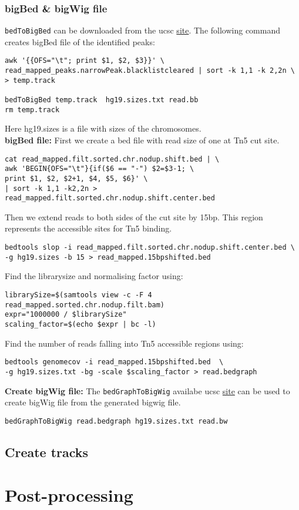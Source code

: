 \documentclass[10pt]{article}
\newcommand{\prog}[1]{\texttt{#1}}
\begin{document}
\subsubsection{bigBed \& bigWig file} \prog{bedToBigBed} can be downloaded from the ucsc \href{http://hgdownload.cse.ucsc.edu/admin/exe/}{site}. The following command creates bigBed file of the identified peaks:
\begin{verbatim}
awk '{{OFS="\t"; print $1, $2, $3}}' \
read_mapped_peaks.narrowPeak.blacklistcleared | sort -k 1,1 -k 2,2n \
> temp.track

bedToBigBed temp.track  hg19.sizes.txt read.bb
rm temp.track
\end{verbatim}
Here hg19.sizes is a file with sizes of the chromosomes.\\
\textbf{bigBed file:} First we create a bed file with read size of one at Tn5 cut site.
\begin{verbatim}
cat read_mapped.filt.sorted.chr.nodup.shift.bed | \
awk 'BEGIN{OFS="\t"}{if($6 == "-") $2=$3-1; \
print $1, $2, $2+1, $4, $5, $6}' \
| sort -k 1,1 -k2,2n >  read_mapped.filt.sorted.chr.nodup.shift.center.bed
\end{verbatim}
Then we extend reads to both sides of the cut site by 15bp. This region represents the accessible sites for Tn5 binding.
\begin{verbatim}
bedtools slop -i read_mapped.filt.sorted.chr.nodup.shift.center.bed \
-g hg19.sizes -b 15 > read_mapped.15bpshifted.bed
\end{verbatim}
Find the librarysize and normalising factor using:
\begin{verbatim}
librarySize=$(samtools view -c -F 4 read_mapped.sorted.chr.nodup.filt.bam)
expr="1000000 / $librarySize"
scaling_factor=$(echo $expr | bc -l)
\end{verbatim}
Find the number of reads falling into Tn5 accessible regions using:
\begin{verbatim}
bedtools genomecov -i read_mapped.15bpshifted.bed  \
-g hg19.sizes.txt -bg -scale $scaling_factor > read.bedgraph
\end{verbatim}
\textbf{Create bigWig file:} The \prog{bedGraphToBigWig} availabe ucsc \href{http://hgdownload.cse.ucsc.edu/admin/exe/}{site} can be used to create bigWig file from the generated bigwig file.
\begin{verbatim}
bedGraphToBigWig read.bedgraph hg19.sizes.txt read.bw
\end{verbatim}
\subsection{Create tracks}
\section{Post-processing}
\end{document}
